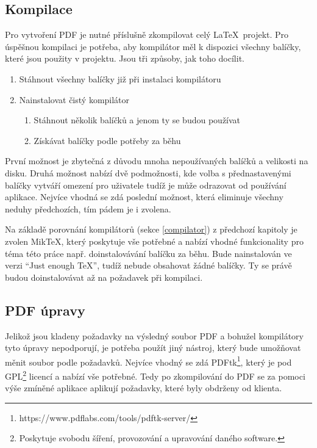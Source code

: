 \subsection{Kompilace}
Pro vytvoření PDF je nutné příslušně zkompilovat celý \LaTeX\ projekt. Pro úspěšnou kompilaci je potřeba, aby kompilátor měl k dispozici všechny balíčky, které jsou použity v projektu. Jsou tři způsoby, jak toho docílit.
\begin{enumerate}
	\item Stáhnout všechny balíčky již při instalaci kompilátoru
	\item Nainstalovat čistý kompilátor
		\begin{enumerate}
			\item Stáhnout několik balíčků a jenom ty se budou používat
			\item Získávat balíčky podle potřeby za běhu
		\end{enumerate}
\end{enumerate}
První možnost je zbytečná z důvodu mnoha nepoužívaných balíčků a velikosti na disku. Druhá možnost nabízí dvě podmožnosti, kde volba s přednastavenými balíčky vytváří omezení pro uživatele tudíž je může odrazovat od používání aplikace. Nejvíce vhodná se zdá poslední možnost, která eliminuje všechny neduhy předchozích, tím pádem je i zvolena.
\par
Na základě porovnání kompilátorů (sekce \ref{compilator}) z předchozí kapitoly je zvolen MikTeX, který poskytuje vše potřebné a nabízí vhodné funkcionality pro téma této práce např. doinstalovávání balíčku za běhu. Bude nainstalován ve verzi \enquote{Just enough TeX}, tudíž nebude obsahovat žádné balíčky. Ty se právě budou doinstalovávat až na požadavek při kompilaci.

\subsection{PDF úpravy}
Jelikož jsou kladeny požadavky na výsledný soubor PDF a bohužel kompilátory tyto úpravy nepodporují, je potřeba použít jiný nástroj, který bude umožňovat měnit soubor podle požadavků. Nejvíce vhodný se zdá PDFtk\footnote{https://www.pdflabs.com/tools/pdftk-server/}, který je pod GPL\footnote{Poskytuje svobodu šíření, provozování a upravování daného software.} licencí a nabízí vše potřebné. Tedy po zkompilování do PDF se za pomoci výše zmíněné aplikace aplikují požadavky, které byly obdrženy od klienta.

